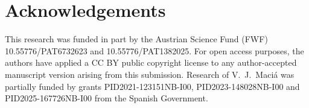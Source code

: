 \documentclass[english,11pt]{smfart}
\numberwithin{equation}{section}
\begin{document}
\section{Acknowledgements}

This research was funded in part by the Austrian Science Fund (FWF) 10.55776/PAT6732623 and 10.55776/PAT1382025. For open access purposes, the authors have applied a CC BY public copyright license to any author-accepted manuscript version arising from this submission. Research of V.~J.\ Maci\'a was partially funded by grants PID2021-123151NB-I00, PID2023-148028NB-I00 and PID2025-167726NB-I00 from the Spanish Government.





\end{document}

